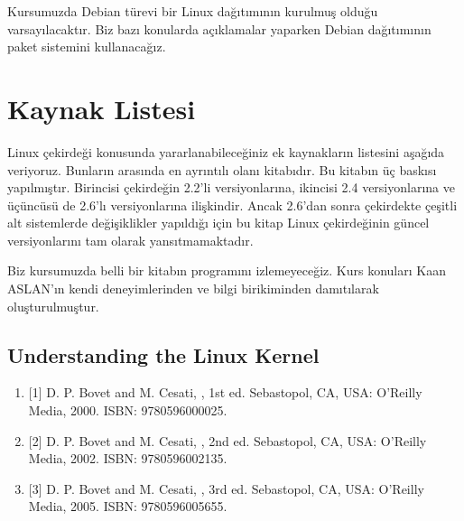 \documentclass[a4paper,10pt,turkish]{sphinxmanual}
\begin{document}
\sphinxAtStartPar
Kursumuzda Debian türevi bir Linux dağıtımının kurulmuş olduğu varsayılacaktır. Biz bazı
konularda açıklamalar yaparken Debian dağıtımının  paket sistemini kullanacağız.


\section{Kaynak Listesi}
\label{\detokenize{introduction:kaynak-listesi}}
\sphinxAtStartPar
Linux çekirdeği konusunda yararlanabileceğiniz ek kaynakların listesini aşağıda veriyoruz. Bunların arasında en ayrıntılı
olanı  kitabıdır. Bu kitabın üç baskısı yapılmıştır. Birincisi çekirdeğin 2.2’li versiyonlarına,
ikincisi 2.4 versiyonlarına ve üçüncüsü de 2.6’lı versiyonlarına ilişkindir. Ancak 2.6’dan sonra çekirdekte çeşitli alt sistemlerde
değişiklikler yapıldığı için bu kitap Linux çekirdeğinin güncel versiyonlarını tam olarak yansıtmamaktadır.

\sphinxAtStartPar
Biz kursumuzda belli bir kitabın programını izlemeyeceğiz. Kurs konuları Kaan ASLAN’ın kendi deneyimlerinden ve bilgi birikiminden
damıtılarak oluşturulmuştur.


\subsection{Understanding the Linux Kernel}
\label{\detokenize{introduction:understanding-the-linux-kernel}}\begin{enumerate}
%
\item {} 
\sphinxAtStartPar
{[}1{]} D. P. Bovet and M. Cesati, , 1st ed.
Sebastopol, CA, USA: O’Reilly Media, 2000.
ISBN: 978\sphinxhyphen{}0\sphinxhyphen{}596\sphinxhyphen{}00002\sphinxhyphen{}5.

\item {} 
\sphinxAtStartPar
{[}2{]} D. P. Bovet and M. Cesati, , 2nd ed.
Sebastopol, CA, USA: O’Reilly Media, 2002.
ISBN: 978\sphinxhyphen{}0\sphinxhyphen{}596\sphinxhyphen{}00213\sphinxhyphen{}5.

\item {} 
\sphinxAtStartPar
{[}3{]} D. P. Bovet and M. Cesati, , 3rd ed.
Sebastopol, CA, USA: O’Reilly Media, 2005.
ISBN: 978\sphinxhyphen{}0\sphinxhyphen{}596\sphinxhyphen{}00565\sphinxhyphen{}5.

\end{enumerate}
\end{document}
